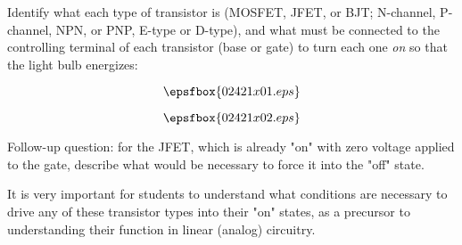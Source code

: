 

Identify what each type of transistor is (MOSFET, JFET, or BJT; N-channel, P-channel, NPN, or PNP, E-type or D-type), and what must be connected to the controlling terminal of each transistor (base or gate) to turn each one {\it on} so that the light bulb energizes:

$$\epsfbox{02421x01.eps}$$







$$\epsfbox{02421x02.eps}$$

\vskip 10pt

Follow-up question: for the JFET, which is already "on" with zero voltage applied to the gate, describe what would be necessary to force it into the "off" state.







It is very important for students to understand what conditions are necessary to drive any of these transistor types into their "on" states, as a precursor to understanding their function in linear (analog) circuitry.




